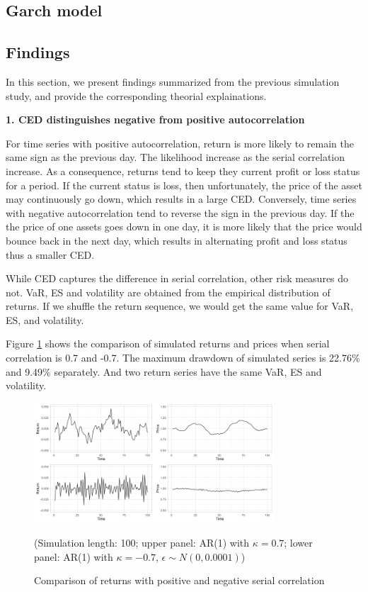 \documentclass[11pt]{article}
\begin{document}
\subsection{Garch model}

\subsection{Findings}

In this section, we present findings summarized from the previous simulation study, and provide the corresponding theorial explainations. 

\textbf{1. CED distinguishes negative from positive autocorrelation}

For time series with positive autocorrelation, return is more likely to remain the same sign as the previous day. The likelihood increase as the serial correlation increase. As a consequence, returns tend to keep they current profit or loss status for a period. If the current status is loss, then unfortunately, the price of the asset may continuously go down, which results in a large CED. Conversely, time series with negative autocorrelation tend to reverse the sign in the previous day. If the the price of one assets goes down in one day, it is more likely that the price would bounce back in the next day, which results in alternating profit and loss status thus a smaller CED.

While CED captures the difference in serial correlation, other risk measures do not. VaR, ES and volatility are obtained from the empirical distribution of returns. If we shuffle the return sequence, we would get the same value for VaR, ES, and volatility.

Figure \ref{fig:Comparison_pos_neg_autocorrelation} shows the comparison of simulated returns and prices when serial correlation is 0.7 and -0.7. The maximum drawdown of simulated series is 22.76\% and 9.49\% separately. And two return series have the same VaR, ES and volatility.

\begin{figure}[H]
\centering
\includegraphics[width = 0.8\textwidth]{../figures/simulation/Comparison_pos_neg_autocorrelation}
\caption{Comparison of returns with positive and negative serial correlation}
(Simulation length: 100; upper panel: AR(1) with $\kappa=0.7$; lower panel: AR(1) with $\kappa=-0.7$, $\epsilon\sim N(0, 0.0001)$)
\label{fig:Comparison_pos_neg_autocorrelation}
\end{figure}
\end{document}
